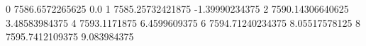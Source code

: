 0 7586.6572265625 0.0
1 7585.25732421875 -1.39990234375
2 7590.14306640625 3.48583984375
4 7593.1171875 6.4599609375
6 7594.71240234375 8.05517578125
8 7595.7412109375 9.083984375
